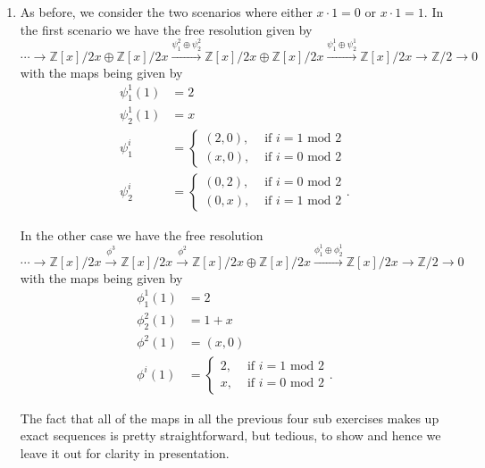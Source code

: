 \documentclass[a4paper]{article}
\begin{document}
\begin{exercise}{3}
\begin{enumerate}
  \item As before, we consider the two scenarios where either $ x \cdot 1 = 0 $ or $ x \cdot 1 = 1 $. In the first scenario we have the free resolution given by
    \begin{equation*}
      \cdots \to \mathbb{Z}[x]/2x \oplus \mathbb{Z}[x]/2x \xrightarrow{\psi_1^2 \oplus \psi_2^2} \mathbb{Z}[x]/2x \oplus \mathbb{Z}[x]/2x \xrightarrow{\psi_1^{1} \oplus \psi_2^{1}} \mathbb{Z}[x]/2x \to \mathbb{Z}/2 \to 0
    \end{equation*}
    with the maps being given by
    \begin{align*}
      \psi_1^{1}(1) &= 2 \\
      \psi_2^{1}(1) &= x \\
      \psi_1^{i} &= \begin{cases}
        (2, 0), &\text{ if } i = 1 \text{ mod } 2 \\
        (x, 0), &\text{ if } i = 0 \text{ mod } 2
      \end{cases} \\
      \psi_2^{i} &= \begin{cases}
        (0, 2), &\text{ if } i = 0 \text{ mod } 2 \\
        (0, x), &\text{ if } i = 1 \text{ mod } 2
      \end{cases}
    .\end{align*}

    In the other case we have the free resolution
    \begin{equation*}
      \cdots \to \mathbb{Z}[x]/2x \xrightarrow{\phi^{3}} \mathbb{Z}[x]/2x \xrightarrow{\phi^2} \mathbb{Z}[x]/2x \oplus \mathbb{Z}[x]/2x \xrightarrow{\phi_1^{1} \oplus \phi_2^1} \mathbb{Z}[x]/2x \to \mathbb{Z}/2 \to 0
    \end{equation*}
    with the maps being given by
    \begin{align*}
      \phi_1^{1}(1) &= 2 \\
      \phi_2^2(1) &= 1 + x \\
      \phi^2(1) &= (x, 0) \\
      \phi^{i}(1) &= \begin{cases}
        2, &\text{ if } i = 1 \text{ mod } 2\\
        x, &\text{ if } i = 0 \text{ mod } 2
      \end{cases}
    .\end{align*}

    The fact that all of the maps in all the previous four sub exercises makes up exact sequences is pretty straightforward, but tedious, to show and hence we leave it out for clarity in presentation.
\end{enumerate}
\end{exercise}
\end{document}
